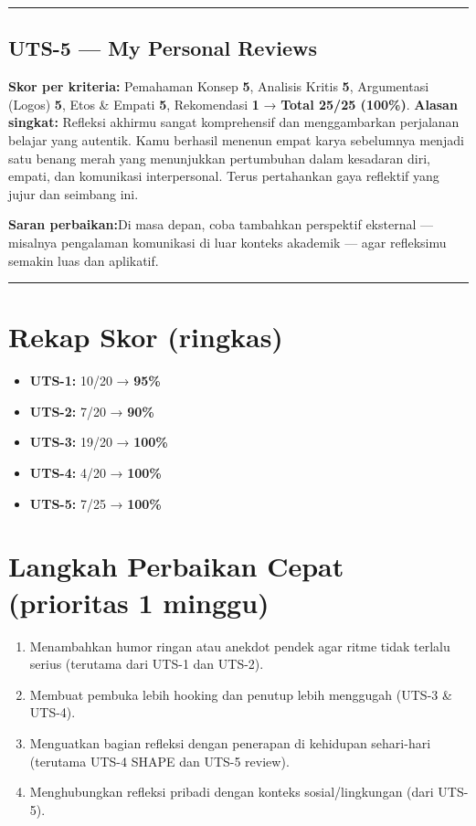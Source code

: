 \documentclass[
  letterpaper,
  DIV=11,
  numbers=noendperiod]{scrreprt}
\providecommand{\tightlist}{%
  \setlength{\itemsep}{0pt}\setlength{\parskip}{0pt}}
\begin{document}
\begin{center}\rule{0.5\linewidth}{0.5pt}\end{center}

\subsection{UTS-5 --- My Personal
Reviews}\label{uts-5-my-personal-reviews-1}

\textbf{Skor per kriteria:} Pemahaman Konsep \textbf{5}, Analisis Kritis
\textbf{5}, Argumentasi (Logos) \textbf{5}, Etos \& Empati \textbf{5},
Rekomendasi \textbf{1} → \textbf{Total 25/25 (100\%)}. \textbf{Alasan
singkat:} Refleksi akhirmu sangat komprehensif dan menggambarkan
perjalanan belajar yang autentik. Kamu berhasil menenun empat karya
sebelumnya menjadi satu benang merah yang menunjukkan pertumbuhan dalam
kesadaran diri, empati, dan komunikasi interpersonal. Terus pertahankan
gaya reflektif yang jujur dan seimbang ini.

\textbf{Saran perbaikan:}Di masa depan, coba tambahkan perspektif
eksternal --- misalnya pengalaman komunikasi di luar konteks akademik
--- agar refleksimu semakin luas dan aplikatif.

\begin{center}\rule{0.5\linewidth}{0.5pt}\end{center}

\section{Rekap Skor (ringkas)}\label{rekap-skor-ringkas}

\begin{itemize}
\tightlist
\item
  \textbf{UTS-1:} 10/20 → \textbf{95\%}
\item
  \textbf{UTS-2:} 7/20 → \textbf{90\%}
\item
  \textbf{UTS-3:} 19/20 → \textbf{100\%}
\item
  \textbf{UTS-4:} 4/20 → \textbf{100\%}
\item
  \textbf{UTS-5:} 7/25 → \textbf{100\%}
\end{itemize}

\section{Langkah Perbaikan Cepat (prioritas 1
minggu)}\label{langkah-perbaikan-cepat-prioritas-1-minggu}

\begin{enumerate}
\def\labelenumi{\arabic{enumi}.}
\tightlist
\item
  Menambahkan humor ringan atau anekdot pendek agar ritme tidak terlalu
  serius (terutama dari UTS-1 dan UTS-2).
\item
  Membuat pembuka lebih hooking dan penutup lebih menggugah (UTS-3 \&
  UTS-4).
\item
  Menguatkan bagian refleksi dengan penerapan di kehidupan sehari-hari
  (terutama UTS-4 SHAPE dan UTS-5 review).
\item
  Menghubungkan refleksi pribadi dengan konteks sosial/lingkungan (dari
  UTS-5).
\end{enumerate}
\end{document}
